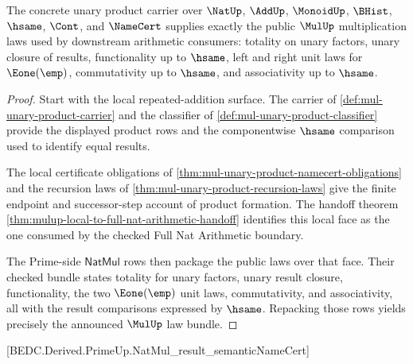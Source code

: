 \begin{theorem}
\label{thm:mulup-unary-multiplication-law-bundle}
The concrete unary product carrier over $\NatUp$, $\AddUp$, $\MonoidUp$, $\BHist$, $\hsame$, $\Cont$, and $\NameCert$ supplies exactly the public $\MulUp$ multiplication laws used by downstream arithmetic consumers: totality on unary factors, unary closure of results, functionality up to $\hsame$, left and right unit laws for $\Eone(\emp)$, commutativity up to $\hsame$, and associativity up to $\hsame$.
\end{theorem}
\begin{proof}
Start with the local repeated-addition surface. The carrier of \autoref{def:mul-unary-product-carrier} and the classifier of \autoref{def:mul-unary-product-classifier} provide the displayed product rows and the componentwise $\hsame$ comparison used to identify equal results.

The local certificate obligations of \autoref{thm:mul-unary-product-namecert-obligations} and the recursion laws of \autoref{thm:mul-unary-product-recursion-laws} give the finite endpoint and successor-step account of product formation. The handoff theorem \autoref{thm:mulup-local-to-full-nat-arithmetic-handoff} identifies this local face as the one consumed by the checked Full Nat Arithmetic boundary.

The Prime-side $\mathsf{NatMul}$ rows then package the public laws over that face. Their checked bundle states totality for unary factors, unary result closure, functionality, the two $\Eone(\emp)$ unit laws, commutativity, and associativity, all with the result comparisons expressed by $\hsame$. Repacking those rows yields precisely the announced $\MulUp$ law bundle.
\end{proof}

[BEDC.Derived.PrimeUp.NatMul\_result\_semanticNameCert]

